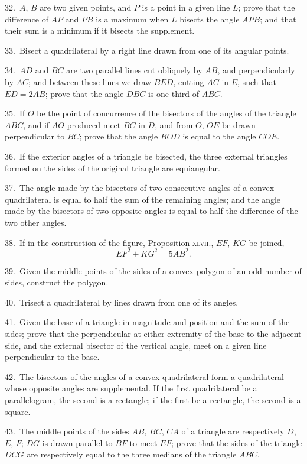 \documentclass[oneside]{book}
\begin{document}
\begin{footnotesize}
32.~$A$, $B$ are two given points, and $P$ is a point in a given line
$L$; prove that the difference of $AP$ and $PB$ is a maximum when
$L$ bisects the angle $APB$; and that their sum is a minimum if it
bisects the supplement.

33.~Bisect a quadrilateral by a right line drawn from one of
its angular points.

34.~$AD$ and $BC$ are two parallel lines cut obliquely by $AB$, and
perpendicularly by $AC$; and between these lines we draw $BED$,
cutting $AC$ in $E$, such that $ED = 2AB$; prove that the angle $DBC$
is one-third of $ABC$.

35.~If $O$ be the point of concurrence of the bisectors of the
angles of the triangle $ABC$, and if $AO$ produced meet $BC$ in $D$,
and from $O$, $OE$ be drawn perpendicular to $BC$; prove that the
angle $BOD$ is equal to the angle $COE$.

36.~If the exterior angles of a triangle be bisected, the three
external triangles formed on the sides of the original triangle are
equiangular.

37.~The angle made by the bisectors of two consecutive angles
of a convex quadrilateral is equal to half the sum of the
remaining angles; and the angle made by the bisectors of two opposite
angles is equal to half the difference of the two other angles.

38.~If in the construction of the figure, Proposition \textsc{xlvii.},
$EF$, $KG$ be joined,
\[
EF^2 + KG^2 = 5AB^2.
\]

39.~Given the middle points of the sides of a convex polygon
of an odd number of sides, construct the polygon.

40.~Trisect a quadrilateral by lines drawn from one of its
angles.

41.~Given the base of a triangle in magnitude and position and
the sum of the sides; prove that the perpendicular at either extremity
of the base to the adjacent side, and the external bisector
of the vertical angle, meet on a given line perpendicular to the
base.

42.~The bisectors of the angles of a convex quadrilateral form
a quadrilateral whose opposite angles are supplemental. If the
first quadrilateral be a parallelogram, the second is a rectangle;
if the first be a rectangle, the second is a square.

43.~The middle points of the sides $AB$, $BC$, $CA$ of a triangle
are respectively $D$, $E$, $F$; $DG$ is drawn parallel to $BF$ to meet
$EF$; prove that the sides of the triangle $DCG$ are respectively
equal to the three medians of the triangle $ABC$.


\end{footnotesize}
\end{document}
